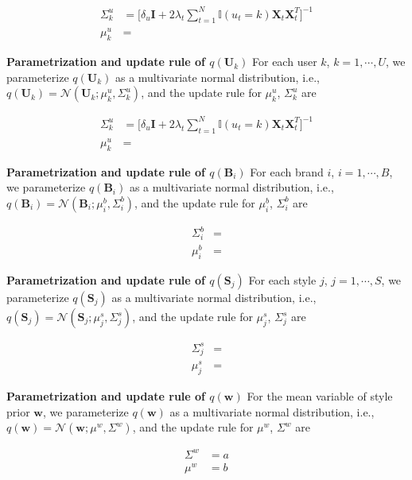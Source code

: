 \begin{align}
\label{eq:start}
\Sigma_k^u & = \big[  \delta_u \mathbf{I} + 2\lambda_t \sum_{t=1}^N \mathbb{I}(u_t = k) \mathbf{X}_t \mathbf{X}_t^T  \big]^{-1} \\ 
\mu^u_k & = 
\end{align}

\noindent \textbf{Parametrization and update rule of $q(\mathbf{U}_k)$}
For each user $k$, $k = 1, \cdots, U$, we parameterize $q(\mathbf{U}_k)$ as a multivariate normal distribution, i.e., $q(\mathbf{U}_k) = \mathcal{N}(\mathbf{U}_k; \mu^u_k, \Sigma_k^u)$, and the update rule for $\mu^u_k$, $\Sigma_k^u$ are 

\begin{align}
\Sigma_k^u & = \big[  \delta_u \mathbf{I} + 2\lambda_t \sum_{t=1}^N \mathbb{I}(u_t = k) \mathbf{X}_t \mathbf{X}_t^T  \big]^{-1} \\ 
\mu^u_k & = 
\end{align}

\noindent \textbf{Parametrization and update rule of $q(\mathbf{B}_i)$}
For each brand $i$, $i = 1, \cdots, B$, we parameterize $q(\mathbf{B}_i)$ as a multivariate normal distribution, i.e., $q(\mathbf{B}_i) = \mathcal{N}(\mathbf{B}_i; \mu^b_i, \Sigma^b_i)$, and the update rule for $\mu^b_i$, $\Sigma^b_i$ are 

\begin{align}
\Sigma^b_i & = \\ 
\mu^b_i & = 
\end{align}


\noindent \textbf{Parametrization and update rule of $q(\mathbf{S}_j)$}
For each style $j$, $j = 1, \cdots, S$, we parameterize $q(\mathbf{S}_j)$ as a multivariate normal distribution, i.e., $q(\mathbf{S}_j) = \mathcal{N}(\mathbf{S}_j; \mu^s_j, \Sigma^s_j)$, and the update rule for $\mu^s_j$, $\Sigma^s_j$ are 

\begin{align}
\Sigma^s_j & = \\ 
\mu^s_j & = 
\end{align}


\noindent \textbf{Parametrization and update rule of $q(\mathbf{w})$}
For the mean variable of style prior $\mathbf{w}$, we parameterize $q(\mathbf{w})$ as a multivariate normal distribution, i.e., $q(\mathbf{w}) = \mathcal{N}(\mathbf{w}; \mu^w, \Sigma^w)$, and the update rule for $\mu^w$, $\Sigma^w$ are 

\begin{align}
\Sigma^w & = a\\ 
\mu^w & = b
\end{align}


